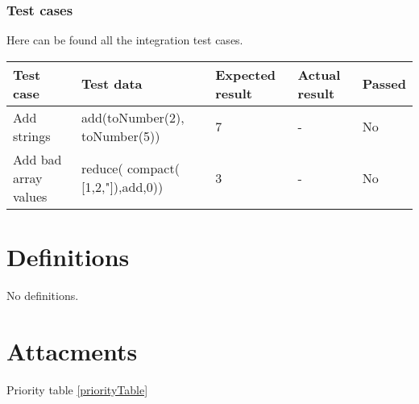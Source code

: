\documentclass[a4paper, 12pt]{article}
\begin{document}
        \subsubsection{Test cases}  
        Here can be found all the integration test cases.



        \begin{table}[h!]
            \begin{tabular}{|p{3cm}|p{4cm}|p{2cm}|p{2cm}|l|}
            \hline
             Test case            & Test data                           & Expected result & Actual result & Passed \\ \hline
             Add strings          & add(toNumber(2), toNumber(5))        & 7               & -             & No     \\ \hline
            Add bad array values & reduce( compact( {[}1,2,"{]}),add,0)) & 3               & -             & No     \\ \hline
            \end{tabular}
            \end{table}
        
 
\newpage

\section{Definitions}

No definitions. 






\section*{Attacments}

Priority table \ref{priorityTable}
\end{document}
